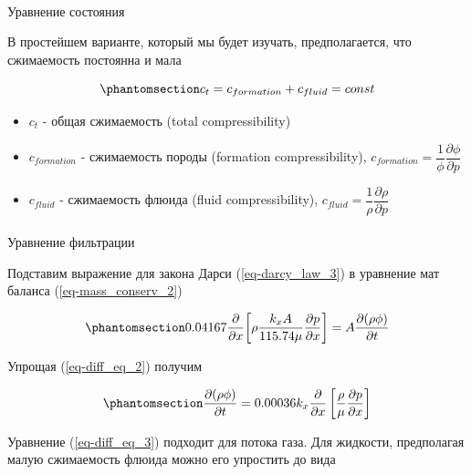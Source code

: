 \documentclass[
  russian,
  letterpaper,
  DIV=11,
  numbers=noendperiod,
  oneside]{scrartcl}
\makeatletter
\let\oldparagraph\paragraph
\renewcommand{\paragraph}{
    \@ifstar
      \xxxParagraphStar
      \xxxParagraphNoStar
  }
\newcommand{\xxxParagraphStar}[1]{\oldparagraph*{#1}\mbox{}}
\newcommand{\xxxParagraphNoStar}[1]{\oldparagraph{#1}\mbox{}}
\providecommand{\tightlist}{%
  \setlength{\itemsep}{0pt}\setlength{\parskip}{0pt}}
\makeatother
\begin{document}
\paragraph{Уравнение
состояния}\label{ux443ux440ux430ux432ux43dux435ux43dux438ux435-ux441ux43eux441ux442ux43eux44fux43dux438ux44f}

В простейшем варианте, который мы будет изучать, предполагается, что
сжимаемость постоянна и мала

\begin{equation}\phantomsection\label{eq-eos_2}{
c_t = c_{formation} + c_{fluid} = const
}\end{equation}

\begin{itemize}
\tightlist
\item
  \(c_t\) - общая сжимаемость (total compressibility)
\item
  \(c_{formation}\) - сжимаемость породы (formation compressibility),
  \(c_{formation} = \dfrac{1}{\phi}\dfrac{\partial \phi}{\partial p}\)
\item
  \(c_{fluid}\) - сжимаемость флюида (fluid compressibility),
  \(c_{fluid} = \dfrac{1}{\rho}\dfrac{\partial \rho}{\partial p}\)
\end{itemize}

\paragraph{Уравнение
фильтрации}\label{ux443ux440ux430ux432ux43dux435ux43dux438ux435-ux444ux438ux43bux44cux442ux440ux430ux446ux438ux438-1}

Подставим выражение для закона Дарси (\ref{eq-darcy_law_3}) в уравнение
мат баланса (\ref{eq-mass_conserv_2})

\begin{equation}\phantomsection\label{eq-diff_eq_2_}{ 
0.04167 \dfrac{ \partial}{\partial x} { \left[ \rho   \dfrac{k_x A}{115.74\mu} \dfrac{\partial p}{\partial x} \right] } = A \dfrac{\partial(\rho \phi)}{\partial t}  
}\end{equation}

Упрощая (\ref{eq-diff_eq_2}) получим

\begin{equation}\phantomsection\label{eq-diff_eq_3}{ 
\frac{\partial (\rho \phi)}{\partial t} = 0.00036 k_x \dfrac{ \partial}{\partial x}\left[ \dfrac{\rho}{\mu}\dfrac{\partial p}{\partial x} \right] 
}\end{equation}

Уравнение (\ref{eq-diff_eq_3}) подходит для потока газа. Для жидкости,
предполагая малую сжимаемость флюида можно его упростить до вида
\end{document}
